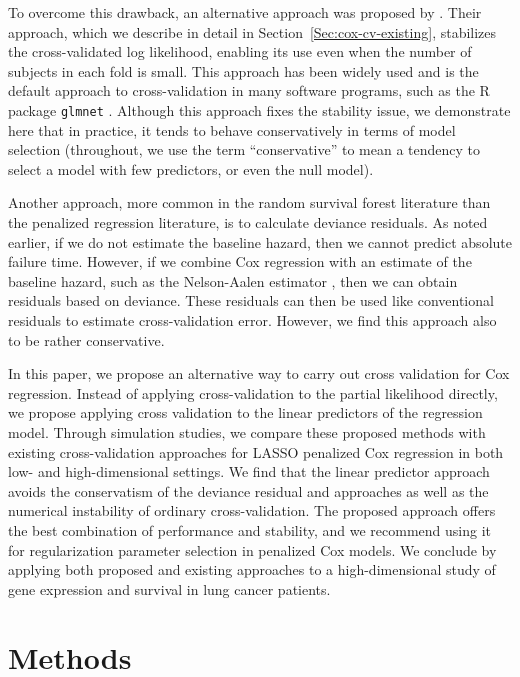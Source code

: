 To overcome this drawback, an alternative approach was proposed by \citet{Verweij1993}.  Their approach, which we describe in detail in Section~\ref{Sec:cox-cv-existing}, stabilizes the cross-validated log likelihood, enabling its use even when the number of subjects in each fold is small.  This approach has been widely used and is the default approach to cross-validation in many software programs, such as the R package {\tt glmnet} \citep{glmnet}.  Although this approach fixes the stability issue, we demonstrate here that in practice, it tends to behave conservatively in terms of model selection (throughout, we use the term ``conservative'' to mean a tendency to select a model with few predictors, or even the null model).

Another approach, more common in the random survival forest literature than the penalized regression literature, is to calculate deviance residuals. As noted earlier, if we do not estimate the baseline hazard, then we cannot predict absolute failure time. However, if we combine Cox regression with an estimate of the baseline hazard, such as the Nelson-Aalen estimator \citep{nelson1969, aalen1978}, then we can obtain residuals based on deviance. These residuals can then be used like conventional residuals to estimate cross-validation error. However, we find this approach also to be rather conservative.

In this paper, we propose an alternative way to carry out cross validation for Cox regression. Instead of applying cross-validation to the partial likelihood directly, we propose applying cross validation to the linear predictors of the regression model. Through simulation studies, we compare these proposed methods with existing cross-validation approaches for LASSO penalized Cox regression in both low- and high-dimensional settings. We find that the linear predictor approach avoids the conservatism of the deviance residual and \citet{Verweij1993} approaches as well as the numerical instability of ordinary cross-validation. The proposed approach offers the best combination of performance and stability, and we recommend using it for regularization parameter selection in penalized Cox models.  We conclude by applying both proposed and existing approaches to a high-dimensional study of gene expression and survival in lung cancer patients.

\section{Methods}
\label{Sec:methods}

